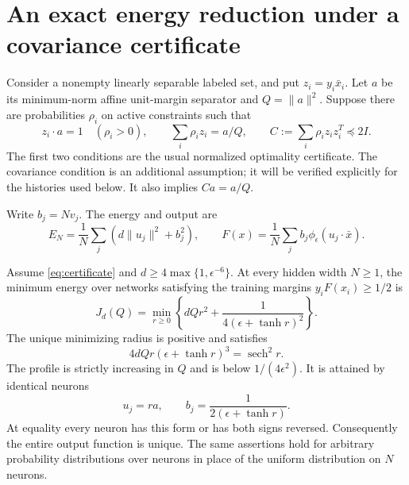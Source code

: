 \section{An exact energy reduction under a covariance certificate}

Consider a nonempty linearly separable labeled set, and put
$z_i=y_i\bar x_i$. Let $a$ be its minimum-norm affine unit-margin
separator and $Q=\|a\|^2$. Suppose there are probabilities $\rho_i$ on
active constraints such that
\begin{equation}\label{eq:certificate}
 z_i\cdot a=1\quad(\rho_i>0),\qquad
 \sum_i\rho_i z_i=a/Q,\qquad
 C:=\sum_i\rho_i z_i z_i^T\preceq2I.
\end{equation}
The first two conditions are the usual normalized optimality
certificate. The covariance condition is an additional assumption;
it will be verified explicitly for the histories used below.
It also implies $Ca=a/Q$.

Write $b_j=Nv_j$. The energy and output are
\begin{equation}\label{eq:energy}
 E_N=\frac1N\sum_j(d\|u_j\|^2+b_j^2),\qquad
 F(x)=\frac1N\sum_j b_j\phi_\epsilon(u_j\cdot\bar x).
\end{equation}

\begin{theorem}\label{thm:exact}
Assume \eqref{eq:certificate} and
$d\ge4\max\{1,\epsilon^{-6}\}$. At every hidden width $N\ge1$, the
minimum energy over networks satisfying the training margins
$y_iF(x_i)\ge1/2$ is
\begin{equation}\label{eq:profile}
 J_d(Q)=\min_{r\ge0}
 \left\{dQr^2+\frac1{4(\epsilon+\tanh r)^2}\right\}.
\end{equation}
The unique minimizing radius is positive and satisfies
\begin{equation}\label{eq:stationarity}
 4dQr(\epsilon+\tanh r)^3=\operatorname{sech}^2r.
\end{equation}
The profile is strictly increasing in $Q$ and is below
$1/(4\epsilon^2)$. It is attained by identical neurons
\[
 u_j=ra,\qquad b_j=\frac1{2(\epsilon+\tanh r)}.
\]
At equality every neuron has this form or has both signs reversed.
Consequently the entire output function is unique. The same assertions
hold for arbitrary probability distributions over neurons in place of
the uniform distribution on $N$ neurons.
\end{theorem}

